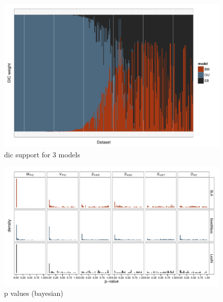 \documentclass[a4paper,12pt]{article}
\begin{document}
\begin{figure}[p]
  \centering
  \includegraphics[angle=90, origin=c, scale=0.8]{figs/dic-support}
  \caption{dic support for 3 models}
  \label{fig:supp-dic}
\end{figure}

\begin{figure}[p]
  \centering
  \includegraphics[angle=90, origin=c, scale=0.85]{figs/pval-hist-bayes}
  \caption{p values (bayesian)}
  \label{fig:supp-pvalues}
\end{figure}
\end{document}
